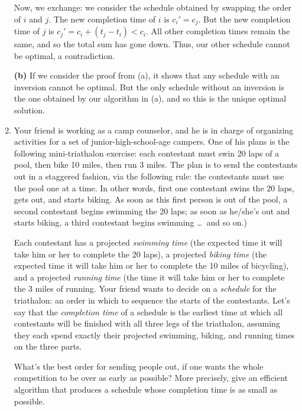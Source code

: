 \documentclass[12pt]{article}
\begin{document}
\begin{enumerate}
{Now, we exchange: we consider the schedule obtained by
swapping the order of $i$ and $j$.
The new completion time of $i$ is $c_i' = c_j$.
But the new completion time of $j$ is
$c_j' = c_i + (t_j - t_i) < c_i$.
All other completion times remain the same, and so
the total sum has gone down.
Thus, our other schedule cannot be optimal, a contradiction.

{\bf (b)} If we consider the proof from (a), it shows
that any schedule with an inversion cannot be optimal.
But the only schedule without an inversion is the one
obtained by our algorithm in (a), and so this
is the unique optimal solution.

}


\item

Your friend is working as a camp counselor, and he
is in charge of organizing activities for a set of
junior-high-school-age campers.
One of his plans is the following mini-triathalon exercise:
each contestant must swin 20 laps of a pool, then bike 10 miles,
then run 3 miles.
The plan is to send the contestants out in a staggered fashion,
via the following rule: the contestants must use the pool
one at a time.
In other words, first one contestant swins the 20 laps,
gets out, and starts biking.
As soon as this first person is out of the pool,
a second contestant begins swimming the 20 laps;
as soon as he/she's out and starts biking, a third
contestant begins swimming \ldots\ and so on.)

Each contestant has a projected {\em swimming time}
(the expected time it will take him or her to complete the 20 laps),
a projected {\em biking time}
(the expected time it will take him or her to complete the
10 miles of bicycling),
and a projected {\em running time}
(the time it will take him or her to complete the 3 miles of running.
Your friend wants to decide on a {\em schedule} for the triathalon:
an order in which to sequence the starts of the contestants.
Let's say that the {\em completion time} of a schedule
is the earliest time at which all contestants will be finished
with all three legs of the triathalon,
assuming they each spend exactly their projected
swimming, biking, and running times on the three parts.

What's the best order for sending people out, if
one wants the whole competition to be over as early as possible?
More precisely, give an efficient algorithm that produces a schedule
whose completion time is as small as possible.


\end{enumerate}
\end{document}
